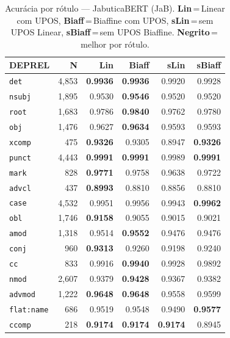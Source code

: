 \begin{table}[ht]
\centering\scriptsize
\setlength{\tabcolsep}{3pt}
\caption{Acurácia por rótulo --- JabuticaBERT (JaB). \textbf{Lin}\,=\,Linear com UPOS, \textbf{Biaff}\,=\,Biaffine com UPOS, \textbf{sLin}\,=\,sem UPOS Linear, \textbf{sBiaff}\,=\,sem UPOS Biaffine. \textbf{Negrito}\,=\,melhor por rótulo.}
\label{tab:acc-jab}
\begin{minipage}[t]{0.60\linewidth}
\centering
\begin{tabular}{l r  r r r r}
\toprule
\textbf{DEPREL} & \textbf{N} & \textbf{Lin} & \textbf{Biaff} & \textbf{sLin} & \textbf{sBiaff} \\
\midrule
\texttt{det} & 4,853 & \textbf{0.9936} & \textbf{0.9936} & 0.9920 & 0.9928 \\
\texttt{nsubj} & 1,895 & 0.9530 & \textbf{0.9546} & 0.9520 & 0.9520 \\
\texttt{root} & 1,683 & 0.9786 & \textbf{0.9840} & 0.9762 & 0.9780 \\
\texttt{obj} & 1,476 & 0.9627 & \textbf{0.9634} & 0.9593 & 0.9593 \\
\texttt{xcomp} & 475 & \textbf{0.9326} & 0.9305 & 0.8947 & \textbf{0.9326} \\
\texttt{punct} & 4,443 & \textbf{0.9991} & \textbf{0.9991} & 0.9989 & \textbf{0.9991} \\
\texttt{mark} & 828 & \textbf{0.9771} & 0.9758 & 0.9638 & 0.9722 \\
\texttt{advcl} & 437 & \textbf{0.8993} & 0.8810 & 0.8856 & 0.8810 \\
\texttt{case} & 4,532 & 0.9951 & 0.9956 & 0.9943 & \textbf{0.9962} \\
\texttt{obl} & 1,746 & \textbf{0.9158} & 0.9055 & 0.9015 & 0.9021 \\
\texttt{amod} & 1,318 & 0.9514 & \textbf{0.9552} & 0.9476 & 0.9476 \\
\texttt{conj} & 960 & \textbf{0.9313} & 0.9260 & 0.9198 & 0.9240 \\
\texttt{cc} & 833 & 0.9916 & \textbf{0.9940} & 0.9928 & 0.9892 \\
\texttt{nmod} & 2,607 & 0.9379 & \textbf{0.9428} & 0.9367 & 0.9382 \\
\texttt{advmod} & 1,222 & \textbf{0.9648} & \textbf{0.9648} & 0.9558 & 0.9599 \\
\texttt{flat\!:\!name} & 686 & 0.9519 & 0.9548 & 0.9490 & \textbf{0.9577} \\
\texttt{ccomp} & 218 & \textbf{0.9174} & \textbf{0.9174} & \textbf{0.9174} & 0.8945 \\

\end{tabular}
\end{minipage}
\end{table}
